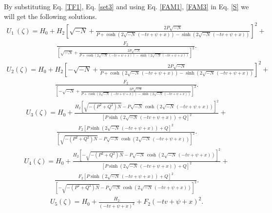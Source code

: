 \documentclass{article}
\numberwithin{equation}{section}
\begin{document}
By substituting Eq. \ref{TF1}, Eq. \ref{set3} and using Eq. \ref{FAM1}, \ref{FAM3} in Eq. \ref{S} we will get the following solutions.\\
\begin{eqnarray}\label{U111}
U_{1}\ \left(\zeta \right) = H_{0}+H_{2} \left[\sqrt{-N}+\frac{2 P \sqrt{-N}}{P +\cosh \! \left(2 \sqrt{-N}\,
\left(-t v +\psi +x \right)\right)-\sinh \! \left(2 \sqrt{-N}\, \left(-t v +\psi +x \right)\right)}\right]^{2}+\nonumber
\end{eqnarray}
\begin{eqnarray}
\frac{F_{2}}{\left[\sqrt{-N}+\frac{2 P \sqrt{-N}}{P +\cosh \left(2 \sqrt{-N}\, \left(-t v +\psi +x \right)\right)-\sinh \left(2 \sqrt{-N}\,
\left(-t v +\psi +x \right)\right)}\right]^{2}}.
\end{eqnarray}
\begin{eqnarray}\label{U222}
U_{2}\! \left(\zeta \right) =
H_{0}+H_{2} \left[-\sqrt{-N}+\frac{2 P \sqrt{-N}}{P +\cosh \! \left(2 \sqrt{-N}\, \left(-t v +\psi +x \right)\right)-\sinh \! \left(2 \sqrt{-N}\, \left(-t v +\psi +x \right)\right)}\right]^{2}+\nonumber
\end{eqnarray}
\begin{eqnarray}
\frac{F_{2}}{\left[-\sqrt{-N}+\frac{2 P \sqrt{-N}}{P +\cosh \left(2 \sqrt{-N}\, \left(-t v +\psi +x \right)\right)-\sinh \left(2 \sqrt{-N}\, \left(-t v +\psi +x \right)\right)}\right]^{2}}.
\end{eqnarray}
\begin{eqnarray}\label{U333}
U_{3}\! \left(\zeta \right) =
H_{0}+\frac{H_{2} {\left[\sqrt{-\left(P^{2}+Q^{2}\right) N}-P \sqrt{-N}\, \cosh \! \left(2 \sqrt{-N}\, \left(-t v +\psi +x \right)\right)\right]}^{2}}{\left[P \sinh \! \left(2 \sqrt{-N}\, \left(-t v +\psi +x \right)\right)+Q \right]^{2}}+\nonumber
\end{eqnarray}
\begin{eqnarray}
\frac{F_{2} \left[P \sinh \! \left(2 \sqrt{-N}\, \left(-t v +\psi +x \right)\right)+Q \right]^{2}}{{\left[\sqrt{-\left(P^{2}+Q^{2}\right) N}-P \sqrt{-N}\, \cosh \! \left(2 \sqrt{-N}\, \left(-t v +\psi +x \right)\right)\right]}^{2}}.
\end{eqnarray}
\begin{eqnarray}\label{U444}
U_{4}\! \left(\zeta \right) =
H_{0}+\frac{H_{2} {\left[-\sqrt{-\left(P^{2}+Q^{2}\right) N}-P \sqrt{-N}\, \cosh \! \left(2 \sqrt{-N}\, \left(-t v +\psi +x \right)\right)\right]}^{2}}{\left[P \sinh \! \left(2 \sqrt{-N}\, \left(-t v +\psi +x \right)\right)+Q \right]^{2}}+\nonumber
\end{eqnarray}
\begin{eqnarray}
\frac{F_{2} \left[P \sinh \! \left(2 \sqrt{-N}\, \left(-t v +\psi +x \right)\right)+Q \right]^{2}}{{\left[-\sqrt{-\left(P^{2}+Q^{2}\right) N}-P \sqrt{-N}\, \cosh \! \left(2 \sqrt{-N}\, \left(-t v +\psi +x \right)\right)\right]}^{2}}.
\end{eqnarray}
\begin{eqnarray}\label{U555}
U_{5}\! \left(\zeta \right) =
H_{0}+\frac{H_{2}}{\left(-t v +\psi +x \right)^{2}}+F_{2} \left(-t v +\psi +x \right)^{2}.
\end{eqnarray}
\newpage
\end{document}
